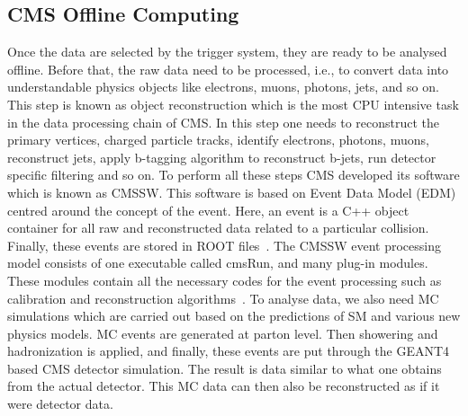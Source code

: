 \subsection{CMS Offline Computing} %
\label{sub:cms_offline_computing}
Once the data are selected by the trigger system, they are ready to be analysed offline. Before that, the raw data need to be processed, i.e., to convert data into understandable physics objects like electrons, muons, photons, jets, and so on. This step is known as object reconstruction which is the most CPU intensive task in the data processing chain of CMS. In this step one needs to reconstruct the primary vertices, charged particle tracks, identify electrons, photons, muons, reconstruct jets, apply b-tagging algorithm to reconstruct b-jets, run detector specific filtering and so on.
To perform all these steps CMS developed its software which is known as CMSSW. This software is based on Event Data Model (EDM) centred around the concept of the event. Here, an event is a C++ object container for all raw and reconstructed data related to a particular collision. Finally, these events are stored in ROOT files~\cite{Root1996}. The CMSSW event processing model consists of one executable called cmsRun, and many plug-in modules. These modules contain all the necessary codes for the event processing such as calibration and reconstruction algorithms~\cite{Bayatyan2005}.
To analyse data, we also need MC simulations which are carried out based on the predictions of SM and various new physics models. MC events are generated at parton level. Then showering and hadronization is applied, and finally, these events are put through the GEANT4~\cite{Agostinelli2003} based CMS detector simulation. The result is data similar to what one obtains from the actual detector. This MC data can then also be reconstructed as if it were  detector data.














